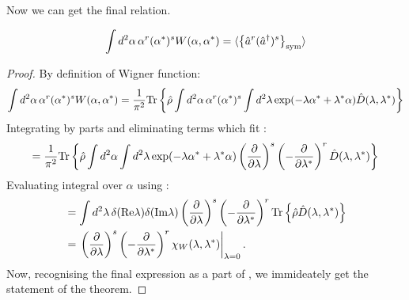Now we can get the final relation.
\begin{theorem}
\label{thm:formalism:sm-wigner:moments}
\[
	\int d^2\alpha\, \alpha^r (\alpha^*)^s W(\alpha, \alpha^*)
	= \langle \left\{  \hat{a}^r (\hat{a}^\dagger)^s  \right\}_{\mathrm{sym}} \rangle
\]
\end{theorem}
\begin{proof}
By definition of Wigner function:
\begin{equation*}
\begin{split}
	\int d^2\alpha\, \alpha^r (\alpha^*)^s W(\alpha, \alpha^*)
	= \frac{1}{\pi^2} \mathrm{Tr} \left\{  \hat{\rho}
		\int d^2\alpha\, \alpha^r (\alpha^*)^s
		\int d^2\lambda \exp(-\lambda \alpha^* + \lambda^* \alpha)
		\hat{D}(\lambda, \lambda^*)
	 \right\}
\end{split}
\end{equation*}
Integrating by parts and eliminating terms which fit :
\[
	= \frac{1}{\pi^2} \mathrm{Tr} \left\{  \hat{\rho}
		\int d^2\alpha \int d^2\lambda
		\exp(-\lambda \alpha^* + \lambda^* \alpha)
		\left( \frac{\partial}{\partial \lambda} \right)^s
		\left( -\frac{\partial}{\partial \lambda^*} \right)^r
		\hat{D} (\lambda, \lambda^*)
	 \right\}
\]
Evaluating integral over $\alpha$ using :
\begin{equation*}
\begin{split}
	& = \int d^2\lambda\,
		\delta (\mathrm{Re} \lambda) \delta (\mathrm{Im} \lambda)
		\left( \frac{\partial}{\partial \lambda} \right)^s
		\left( -\frac{\partial}{\partial \lambda^*} \right)^r
		\mathrm{Tr} \left\{ 
			\hat{\rho}
			\hat{D}(\lambda, \lambda^*)
		 \right\} \\
	& = \left.
		\left( \frac{\partial}{\partial \lambda} \right)^s
		\left( -\frac{\partial}{\partial \lambda^*} \right)^r
		\chi_W (\lambda, \lambda^*)
	\right|_{\lambda=0}.
\end{split}
\end{equation*}
Now, recognising the final expression as a part of ,
we immideately get the statement of the theorem.
\end{proof}

